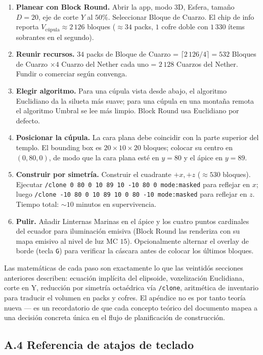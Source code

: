 \documentclass[12pt,a4paper]{scrartcl}
\newcommand{\code}[1]{\texttt{\small #1}}
\newcommand{\cmd}[1]{\textcolor{earth}{\texttt{\small #1}}}
\begin{document}
\begin{enumerate}[leftmargin=1.6em,itemsep=0.3em,topsep=0.3em]
  \item \textbf{Planear con Block Round.} Abrir la app, modo 3D, Esfera, tamaño $D=20$, eje de corte $Y$ al $50\%$. Seleccionar Bloque de Cuarzo. El chip de info reporta $V_{\mathrm{cúpula}} \approx 2\,126$ bloques ($\approx 34$ packs, $1$ cofre doble con $1\,330$ ítems sobrantes en el segundo).
  \item \textbf{Reunir recursos.} $34$ packs de Bloque de Cuarzo = $\lceil 2\,126/4 \rceil = 532$ Bloques de Cuarzo $\times 4$ Cuarzo del Nether cada uno = $2\,128$ Cuarzos del Nether. Fundir o comerciar según convenga.
  \item \textbf{Elegir algoritmo.} Para una cúpula vista desde abajo, el algoritmo Euclidiano da la silueta más suave; para una cúpula en una montaña remota el algoritmo Umbral se lee más limpio. Block Round usa Euclidiano por defecto.
  \item \textbf{Posicionar la cúpula.} La cara plana debe coincidir con la parte superior del templo. El bounding box es $20 \times 10 \times 20$ bloques; colocar su centro en $(0,80,0)$, de modo que la cara plana esté en $y=80$ y el ápice en $y=89$.
  \item \textbf{Construir por simetría.} Construir el cuadrante $+x, +z$ ($\approx 530$ bloques). Ejecutar \cmd{/clone 0 80 0 10 89 10 -10 80 0 mode:masked} para reflejar en $x$; luego \cmd{/clone -10 80 0 10 89 10 0 80 -10 mode:masked} para reflejar en $z$. Tiempo total: $\sim 10$ minutos en supervivencia.
  \item \textbf{Pulir.} Añadir Linternas Marinas en el ápice y los cuatro puntos cardinales del ecuador para iluminación emisiva (Block Round las renderiza con su mapa emisivo al nivel de luz MC $15$). Opcionalmente alternar el overlay de borde (tecla \code{G}) para verificar la cáscara antes de colocar los últimos bloques.
\end{enumerate}

Las matemáticas de cada paso son exactamente lo que las veintidós secciones anteriores describen: ecuación implícita del elipsoide, voxelización Euclidiana, corte en Y, reducción por simetría octaédrica vía \cmd{/clone}, aritmética de inventario para traducir el volumen en packs y cofres. El apéndice no es por tanto teoría nueva --- es un recordatorio de que cada concepto teórico del documento mapea a una decisión concreta única en el flujo de planificación de construcción.

\subsection*{A.4 Referencia de atajos de teclado}
\end{document}
